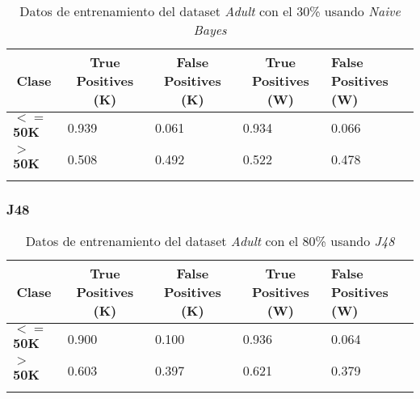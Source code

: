 \documentclass[10pt,a4paper]{article}
\begin{document}
\begin{table}[h]
\begin{tabular}{lllll}
\hline
\multicolumn{1}{|c|}{\textbf{Clase}} & \multicolumn{1}{c|}{\textbf{True Positives (K)}} & \multicolumn{1}{c|}{\textbf{False Positives (K)}} & \multicolumn{1}{c|}{\textbf{True Positives (W)}} & \multicolumn{1}{l|}{\textbf{False Positives (W)}} \\ \hline
\multicolumn{1}{|l|}{\textbf{$<=$50K}} & \multicolumn{1}{l|}{0.939}          & \multicolumn{1}{l|}{0.061}          & \multicolumn{1}{l|}{0.934}          & \multicolumn{1}{l|}{0.066} \\ \hline
\multicolumn{1}{|l|}{\textbf{$>$50K}} & \multicolumn{1}{l|}{0.508}          & \multicolumn{1}{l|}{0.492}          & \multicolumn{1}{l|}{0.522}          & \multicolumn{1}{l|}{0.478} \\ \hline
\textbf{}                       &                                &                                &                                &                      
\end{tabular}
\caption{Datos de entrenamiento del dataset \emph{Adult} con el 30\% usando \emph{Naive Bayes}}
\label{tab:adult_bayes_30}
\end{table}

\newpage
\subsubsection{J48}

\begin{table}[h]
\begin{tabular}{lllll}
\hline
\multicolumn{1}{|c|}{\textbf{Clase}} & \multicolumn{1}{c|}{\textbf{True Positives (K)}} & \multicolumn{1}{c|}{\textbf{False Positives (K)}} & \multicolumn{1}{c|}{\textbf{True Positives (W)}} & \multicolumn{1}{l|}{\textbf{False Positives (W)}} \\ \hline
\multicolumn{1}{|l|}{\textbf{$<=$50K}} & \multicolumn{1}{l|}{0.900}          & \multicolumn{1}{l|}{0.100}          & \multicolumn{1}{l|}{0.936}          & \multicolumn{1}{l|}{0.064} \\ \hline
\multicolumn{1}{|l|}{\textbf{$>$50K}} & \multicolumn{1}{l|}{0.603}          & \multicolumn{1}{l|}{0.397}          & \multicolumn{1}{l|}{0.621}          & \multicolumn{1}{l|}{0.379} \\ \hline
\textbf{}                       &                                &                                &                                &                      
\end{tabular}
\caption{Datos de entrenamiento del dataset \emph{Adult} con el 80\% usando \emph{J48}}
\label{tab:adult_j48_80}
\end{table}
\end{document}
